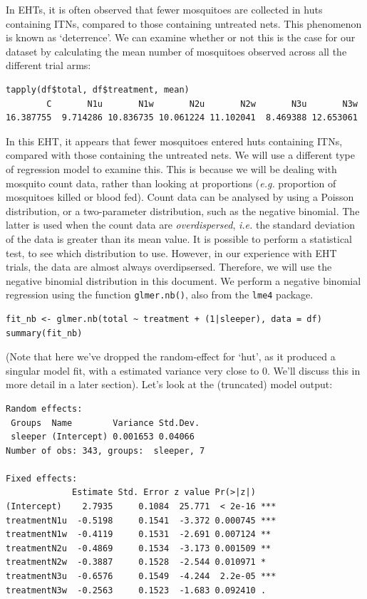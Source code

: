 \documentclass[11pt]{article}
\begin{document}
In EHTs, it is often observed that fewer mosquitoes are collected in huts containing ITNs, compared to those containing untreated nets. This phenomenon is known as `deterrence'. We can examine whether or not this is the case for our dataset by calculating the mean number of mosquitoes observed across all the different trial arms:
\begin{verbatim}
tapply(df$total, df$treatment, mean)
        C       N1u       N1w       N2u       N2w       N3u       N3w 
16.387755  9.714286 10.836735 10.061224 11.102041  8.469388 12.653061 
\end{verbatim}
In this EHT, it appears that fewer mosquitoes entered huts containing ITNs, compared with those containing the untreated nets. 
We will use a different type of regression model to examine this. This is because we will be dealing with mosquito count data, rather than looking at proportions (\textit{e.g.} proportion of mosquitoes killed or blood fed). Count data can be analysed by using a Poisson distribution, or a two-parameter distribution, such as the negative binomial. The latter is used when the count data are \textit{overdispersed}, \textit{i.e.} the standard deviation of the data is greater than its mean value. It is possible to perform a statistical test, to see which distribution to use. However, in our experience with EHT trials, the data are almost always overdipsersed. Therefore, we will use the negative binomial distribution in this document. We perform a negative binomial regression using the function \verb+glmer.nb()+, also from the \verb+lme4+ package.
\begin{verbatim}
fit_nb <- glmer.nb(total ~ treatment + (1|sleeper), data = df)
summary(fit_nb)
\end{verbatim}
(Note that here we've dropped the random-effect for `hut', as it produced a singular model fit, with a estimated variance very close to 0. We'll discuss this in more detail in a later section). Let's look at the (truncated) model output:
\begin{verbatim}
Random effects:
 Groups  Name        Variance Std.Dev.
 sleeper (Intercept) 0.001653 0.04066 
Number of obs: 343, groups:  sleeper, 7

Fixed effects:
             Estimate Std. Error z value Pr(>|z|)    
(Intercept)    2.7935     0.1084  25.771  < 2e-16 ***
treatmentN1u  -0.5198     0.1541  -3.372 0.000745 ***
treatmentN1w  -0.4119     0.1531  -2.691 0.007124 ** 
treatmentN2u  -0.4869     0.1534  -3.173 0.001509 ** 
treatmentN2w  -0.3887     0.1528  -2.544 0.010971 *  
treatmentN3u  -0.6576     0.1549  -4.244  2.2e-05 ***
treatmentN3w  -0.2563     0.1523  -1.683 0.092410 .  
\end{verbatim}
\end{document}
